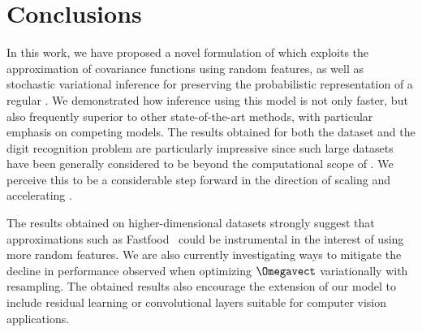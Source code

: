 \section{Conclusions}

In this work, we have proposed a novel formulation of  which exploits the approximation of covariance functions using random features, as well as stochastic variational inference for preserving the probabilistic representation of a regular \gp.
We demonstrated how inference using this model is not only faster, but also frequently superior to other state-of-the-art methods, with particular emphasis on competing \dgp models.
The results obtained for both the \airline dataset and the \mnisteight digit recognition problem are particularly impressive since such large datasets have been generally considered to be beyond the computational scope of .
We perceive this to be a considerable step forward in the direction of scaling and accelerating .

The results obtained on higher-dimensional datasets strongly suggest that approximations such as Fastfood~\cite{Smola13} could be instrumental in the interest of using more random features.
We are also currently investigating ways to mitigate the decline in performance observed when optimizing $\Omegavect$ variationally with resampling. 
The obtained results also encourage the extension of our model to include residual learning or convolutional layers suitable for computer vision applications.
